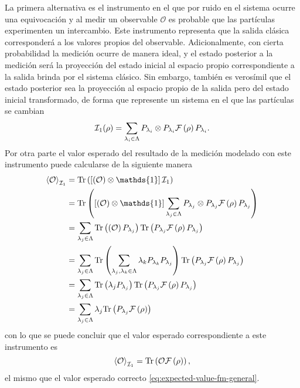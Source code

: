 La primera alternativa es el instrumento en el que por ruido en el sistema
ocurre una equivocación y al medir un observable $\mathcal{O}$ es probable que
las partículas experimenten un intercambio. Este instrumento representa que la
salida clásica corresponderá a los valores propios del observable.
Adicionalmente, con cierta probabilidad la medición ocurre de manera ideal, y
el estado posterior a la medición será la proyección del estado inicial al
espacio propio correspondiente a la salida brinda por el sistema clásico. Sin
embargo, también es verosímil que el estado posterior sea la proyección al
espacio propio de la salida pero del estado inicial transformado, de forma que
represente un sistema en el que las partículas se cambian
\begin{equation}\label{eq:1instrumentnp}
    \mathcal{I}_1(\rho)=\sum_{\lambda_i \in \Lambda }P_{\lambda_i}\otimes P_{\lambda_i}\mathcal{F}\left(\rho\right)P_{\lambda_i}.
\end{equation} 
Por otra parte el valor esperado del resultado de la medición modelado con este
instrumento puede calcularse de la siguiente manera 
\begin{equation*}
    \begin{split}
        \left \la \mathcal{O} \right \ra_{\mathcal{I}_1}&=\tr\left( \left[\left(\mathcal{O}\right) \otimes \mathds{1}\right]\mathcal{I}_1\right) \\
        &=\tr\left(\left[ \left(\mathcal{O}\right)\otimes \mathds{1}\right]\sum_{\lambda_j \in \Lambda}P_{\lambda_j}\otimes P_{\lambda_j}\fuzzy{\rho}P_{\lambda_j} \right)\\
        &=\sum_{\lambda_j\in \Lambda} \tr\left(\left(\mathcal{O}\right) P_{\lambda_j}\right) \tr\left(P_{\lambda_j}\fuzzy{\rho} P_{\lambda_j}\right) \\
        &=\sum_{\lambda_j\in \Lambda} \tr\left(\sum_{{\lambda_j, \lambda_k \in \Lambda}}\lambda_k P_{\lambda_k} P_{\lambda_j}\right) \tr\left(P_{\lambda_j}\fuzzy{\rho} P_{\lambda_j}\right)  \\
        &=\sum_{\lambda_j \in\Lambda} \tr\left(\lambda_j P_{\lambda_j}\right) \tr\left(P_{\lambda_j}\fuzzy{\rho}P_{\lambda_j}\right) \\
        &=\sum_{\lambda_j \in \Lambda} \lambda_j \tr\left(P_{\lambda_j}\fuzzy{\rho}\right) \\
    \end{split}
\end{equation*} 
con lo que se puede concluir que el valor esperado correspondiente a este instrumento es 
\begin{equation}\label{eq:valor-esperado-1instrumentnp}
        \left \langle\mathcal{O} \right \rangle_{\mathcal{I}_1}= {\rm Tr}\left( \mathcal{O} \mathcal{F}\left(\rho\right)\right),
\end{equation}
el mismo que el valor esperado correcto {\eqref{eq:expected-value-fm-general}}.

